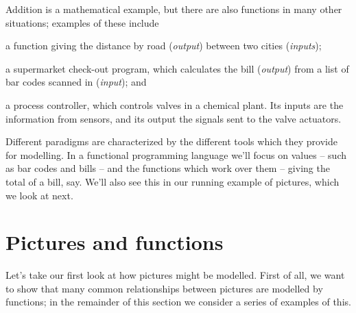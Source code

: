 Addition is a mathematical example, but there are also functions in
many other situations; examples of these include
\label{examples1}  
\begin{titemize}
\item a function giving the distance by road ({\em output}) between two cities
({\em inputs});
\item a supermarket check-out program, which calculates the bill
({\em output}) from a list of bar codes scanned in ({\em input}); and
\item a process controller, which
controls valves in a chemical plant. Its inputs are the information from
sensors, and its output the signals sent to the valve actuators.
\end{titemize}
Different paradigms are characterized by the different tools
which they provide for modelling. In a functional programming language we'll focus on values -- such as bar codes and bills -- and the functions which work over them -- giving the total of a bill, say. We'll also see this
in our running example of pictures, which we look at next.

\section{Pictures and functions}
\label{picturesFuns}


Let's take our first look at how pictures might be modelled.
First of all, we want to show that many common
relationships between pictures are modelled by functions; in the remainder of 
this section we consider a series of examples of this.

